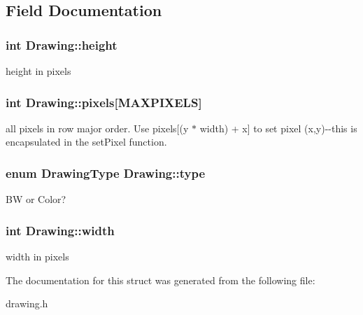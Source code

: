 \subsection{Field Documentation}
\hypertarget{structDrawing_abcce8d1fcf1e398497649243d6696dbf}{
\subsubsection[{height}]{\setlength{\rightskip}{0pt plus 5cm}int {\bf Drawing::height}}}
\label{structDrawing_abcce8d1fcf1e398497649243d6696dbf}
height in pixels \hypertarget{structDrawing_a500b2aecb1926c0ac81072b65f960f91}{
\subsubsection[{pixels}]{\setlength{\rightskip}{0pt plus 5cm}int {\bf Drawing::pixels}\mbox{[}MAXPIXELS\mbox{]}}}
\label{structDrawing_a500b2aecb1926c0ac81072b65f960f91}
all pixels in row major order. Use pixels\mbox{[}(y $\ast$ width) + x\mbox{]} to set pixel (x,y)-\/-\/this is encapsulated in the setPixel function. \hypertarget{structDrawing_a8539b73be2fc3239987909ae1eff6af2}{
\subsubsection[{type}]{\setlength{\rightskip}{0pt plus 5cm}enum DrawingType {\bf Drawing::type}}}
\label{structDrawing_a8539b73be2fc3239987909ae1eff6af2}
BW or Color? \hypertarget{structDrawing_a1844c9959ca62a84c9984f62aa9653b0}{
\subsubsection[{width}]{\setlength{\rightskip}{0pt plus 5cm}int {\bf Drawing::width}}}
\label{structDrawing_a1844c9959ca62a84c9984f62aa9653b0}
width in pixels 

The documentation for this struct was generated from the following file:\begin{DoxyCompactItemize}
\item 
drawing.h\end{DoxyCompactItemize}
